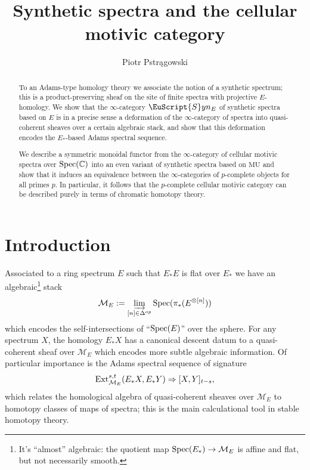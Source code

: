 \documentclass[oneside,a4paper]{amsart}
\newcommand{\euscr}[1]{\EuScript{#1}} %
\newcommand{\Ext}{\textnormal{Ext}} %
\newcommand{\MU}{\mathrm{MU}} %
\newcommand{\synspectra}{\euscr{S}yn} %
\theoremstyle{plain}
\theoremstyle{definition}
\theoremstyle{remark}
\begin{document}
\title[Synthetic spectra]{Synthetic spectra and the cellular motivic category}
\author[Piotr Pstr\k{a}gowski]{Piotr Pstr\k{a}gowski}
\address{Northwestern University}

\begin{abstract}
To an Adams-type homology theory we associate the notion of a synthetic spectrum; this is a product-preserving sheaf on the site of finite spectra with projective $E$-homology. We show that the $\infty$-category $\synspectra_{E}$ of synthetic spectra based on $E$ is in a precise sense a deformation of the $\infty$-category of spectra into quasi-coherent sheaves over a certain algebraic stack, and show that this deformation encodes the $E_{*}$-based Adams spectral sequence.  

We describe a symmetric monoidal functor from the $\infty$-category of cellular motivic spectra over $\textnormal{Spec}(\mathbb{C})$ into an even variant of synthetic spectra based on $\MU$ and show that it induces an equivalence between the $\infty$-categories of $p$-complete objects for all primes $p$. In particular, it follows that the $p$-complete cellular motivic category can be described purely in terms of chromatic homotopy theory. 
\end{abstract}

\maketitle 

\tableofcontents


\section{Introduction} 

Associated to a ring spectrum $E$ such that $E_{*}E$ is flat over $E_{*}$ we have an algebraic\footnote{It's ``almost'' algebraic: the quotient map $\textnormal{Spec}(E_{*}) \rightarrow \mathcal{M}_{E}$ is affine and flat, but not necessarily smooth.} stack 
\[
\mathcal{M}_{E} := \varinjlim_{[n] \in \Delta^{op}} \textnormal{Spec}(\pi_{*}(E^{\otimes [n]}))
\]
which encodes the self-intersections of ``$\textnormal{Spec}(E)$'' over the sphere. For any spectrum $X$, the homology $E_{*}X$ has a canonical descent datum to a quasi-coherent sheaf over $\mathcal{M}_{E}$ which encodes more subtle algebraic information. Of particular importance is the Adams spectral sequence of signature
\begin{equation}
\label{equation:introduction:ass_signature}
\Ext_{\mathcal{M}_{E}}^{s, t}(E_{*}X, E_{*}Y) \Rightarrow [X, Y]_{t-s},
\end{equation}
which relates the homological algebra of quasi-coherent sheaves over $\mathcal{M}_{E}$ to homotopy classes of maps of spectra; this is the main calculational tool in stable homotopy theory. 
\end{document}
